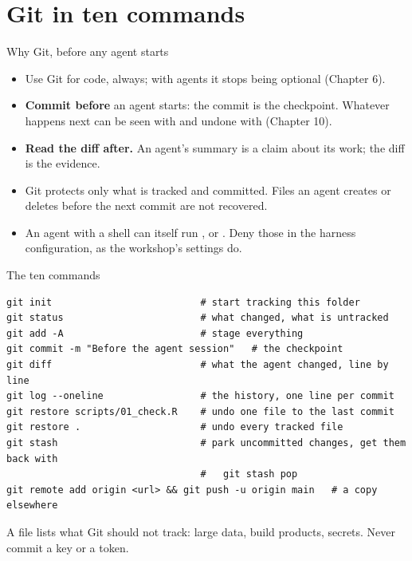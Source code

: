 \documentclass[11pt,aspectratio=169]{beamer}
\begin{document}
\section{Git in ten commands}

\begin{frame}{Why Git, before any agent starts}
  \begin{itemize}
    \item Use Git for code, always; with agents it stops being optional
      (Chapter 6).
    \item \textbf{Commit before} an agent starts: the commit is the checkpoint.
      Whatever happens next can be seen with  and undone with
       (Chapter 10).
    \item \textbf{Read the diff after.} An agent's summary is a claim about
      its work; the diff is the evidence.
    \item Git protects only what is tracked and committed. Files an agent
      creates or deletes before the next commit are not recovered.
    \item An agent with a shell can itself run ,
       or . Deny those in the
      harness configuration, as the workshop's settings do.
  \end{itemize}
\end{frame}

\begin{frame}[fragile]{The ten commands}
  \begin{lstlisting}[style=shell]
git init                          # start tracking this folder
git status                        # what changed, what is untracked
git add -A                        # stage everything
git commit -m "Before the agent session"   # the checkpoint
git diff                          # what the agent changed, line by line
git log --oneline                 # the history, one line per commit
git restore scripts/01_check.R    # undo one file to the last commit
git restore .                     # undo every tracked file
git stash                         # park uncommitted changes, get them back with
                                  #   git stash pop
git remote add origin <url> && git push -u origin main   # a copy elsewhere
  \end{lstlisting}
  A  file lists what Git should not track: large data,
  build products, secrets. Never commit a key or a token.
\end{frame}
\end{document}
